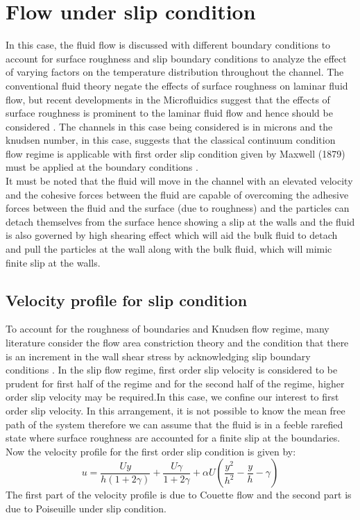 \documentclass[14pt,one side, a4paper]{extbook}
\begin{document}
	 	\section{ Flow under slip condition}
	 	In this case, the fluid flow is discussed with different boundary conditions to account for surface roughness and slip boundary conditions to analyze the effect of varying factors on the temperature distribution throughout the channel. The conventional fluid theory negate the effects of surface roughness on laminar fluid flow, but recent developments in the Microfluidics suggest that the effects of surface roughness is prominent to the laminar fluid flow and hence should be considered \cite{Gamrat,KandlikarSatish}. The channels in this case being considered is in microns and the knudsen number, in this case, suggests that the classical continuum condition flow regime is applicable with first order slip condition given by Maxwell (1879) must be applied at the boundary conditions \cite{Ba10}.\\ It must be noted that the fluid will move in the channel with an elevated velocity and the cohesive forces between the fluid are capable of overcoming the adhesive forces between the fluid and the surface (due to roughness) and the particles can detach themselves from the surface hence showing a slip at the walls and the fluid is also governed by high shearing effect which will aid the bulk fluid to detach and pull the particles at the wall along with the bulk fluid, which will mimic finite slip at the walls.
	 	\subsection{Velocity profile for slip condition}
	 	To account for the roughness of  boundaries and Knudsen flow regime, many literature consider the flow area constriction theory and the condition that there is an increment in the wall shear stress by acknowledging slip boundary conditions \cite{satish}.
	 	In the slip flow regime, first order slip velocity is considered to be prudent for  first half of the regime  and for the second half of the regime, higher order slip velocity may be required.In this case, we confine our interest to first order slip velocity.
	 	In this arrangement, it is not possible to know the mean free path of the system therefore we can assume that the fluid is in a feeble rarefied state where surface roughness are accounted for a finite slip at the boundaries\cite{shams}.\\Now the velocity profile for the first order slip condition is given by:
	 	\begin{equation}
	 		u=\frac{Uy}{h(1+2\gamma)}+\frac{U\gamma}{1+2\gamma}+\alpha U\left(\frac{y^{2}}{h^{2}}-\frac{y}{h}-\gamma\right)
	 	\end{equation}
	 	The first part of the velocity profile is due to Couette flow and the second part is due to Poiseuille under slip condition.
\end{document}

